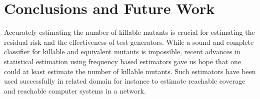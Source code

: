 \documentclass[sigconf,review,anonymous]{acmart}
\begin{document}

\section{Conclusions and Future Work}
Accurately estimating the number of killable mutants is crucial for estimating
the residual risk and the effectiveness of test generators.
While a sound and complete classifier for killable and equivalent mutants is impossible,
recent advances in statistical estimation using frequency %
based estimators gave us hope that one could at least estimate the number of killable mutants.
Such estimators have been used successfully in related domain for instance to estimate
 reachable coverage and reachable computer systems in a network. 

\end{document}
